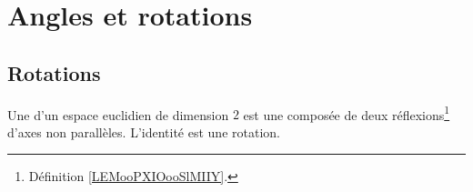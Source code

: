 \section{Angles et rotations}


\subsection{Rotations}

\begin{definition}        \label{DEFooFUBYooHGXphm}
	Une  d'un espace euclidien de dimension \( 2\) est une composée de deux réflexions\footnote{Définition \ref{LEMooPXIOooSlMIIY}.} d'axes non parallèles. L'identité est une rotation.
\end{definition}

